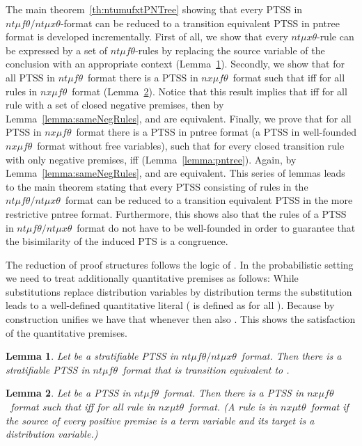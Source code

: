\documentclass[submission,copyright,creativecommons]{eptcs}
\newtheorem{lemma}{Lemma}
\newcommand{\ntmuft}{\ensuremath{\textit{nt}\mu\textit{f}\theta}}
\newcommand{\ntmuxt}{\ensuremath{\textit{nt}\mu\textit{x}\theta}}
\newcommand{\ntmufxt}{\ensuremath{\ntmuft\textit{/}\ntmuxt}}
\newcommand{\nxmuft}{\ensuremath{\textit{nx}\mu\textit{f}\theta}}
\newcommand{\nxmutt}{\ensuremath{\textit{nx}\mu\textit{t}\theta}}
\begin{document}
The main theorem~\ref{th:ntumufxtPNTree} showing that every PTSS in \ntmufxt-format 
can be reduced to a transition equivalent PTSS in pntree format is 
developed incrementally. 
First of all, we show that every \ntmuxt-rule can be expressed by a set of \ntmuft-rules
by replacing the source variable of the conclusion with an appropriate context 
 (Lemma~\ref{lemma:ntmuft}).
Secondly, we show that for all PTSS  in \ntmuft\ format 
there is a PTSS  in \nxmuft\ format such that 
 iff 
for all rules  in \nxmuft\ format (Lemma~\ref{lemma:nxmuft}).
Notice that this result implies that 
 iff 
for all rule  with  a set of closed negative premises, then
by Lemma~\ref{lemma:sameNegRules},  and  are equivalent. 
Finally, we prove that for all PTSS  in \nxmuft\ format 
there is a PTSS  in  pntree format
(a PTSS in well-founded \nxmuft\ format without free variables),
such that for every closed transition rule   
with only negative premises,
 iff  (Lemma~\ref{lemma:pntree}).
Again, by Lemma~\ref{lemma:sameNegRules},  and  are
equivalent. 
This series of lemmas leads to the main theorem stating that every PTSS consisting of rules in the \ntmufxt\ format can be reduced to a transition equivalent PTSS in the more restrictive pntree format. Furthermore, this shows also that the rules of a PTSS in \ntmufxt\ format do not have to be well-founded in order to guarantee that the bisimilarity of the induced PTS is a congruence.

The reduction of proof structures follows the logic of \cite{FokkinkvanGlabbeek96}. In the probabilistic setting we need to treat additionally quantitative premises as follows: While substitutions replace distribution variables by distribution terms the substitution  leads to a well-defined quantitative literal ( is defined as  for all ). Because by construction  unifies  we have that whenever  then also . This shows the satisfaction of the quantitative premises.

\begin{lemma}\label{lemma:ntmuft}
  Let  be a stratifiable PTSS in \ntmufxt\ format.
  Then there is a stratifiable PTSS  in
  \ntmuft\ format that is transition equivalent to .
\end{lemma}

\begin{lemma}\label{lemma:nxmuft}
  Let  be a PTSS in \ntmuft\ format.
  Then there is a PTSS  in
  \nxmuft\ format such that 
   iff 
  for all rule  in \nxmutt\ format.
(A rule is in \nxmutt\ format if the source of every positive
  premise is a term variable and its target is a distribution
  variable.)
\end{lemma}
\end{document}
